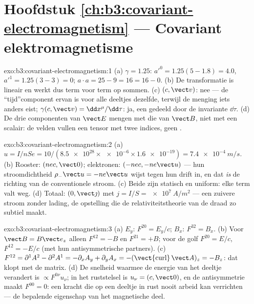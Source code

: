 \section*{Hoofdstuk \ref{ch:b3:covariant-electromagnetism} --- Covariant elektromagnetisme}

\begin{solution}{exo:b3:covariant-electromagnetism:1}
(a) $\gamma = 1.25$: $a'^0 = 1.25(5 - 1.8) = 4.0$, $a'^1 = 1.25(3 -
3) = 0$; $a\cdot a = 25 - 9 = 16 = 16 - 0$. (b) De transformatie is
lineair en werkt dus term voor term op sommen. (c) $(c, \vect v)$: nee
--- de ``tijd''component ervan is voor alle deeltjes dezelfde, terwijl de
menging iets anders eist; $\gamma(c, \vect v) = \dd x^\mu/\dd\tau$: ja,
een  gedeeld door de invariante $\dd\tau$. (d) De drie
componenten van $\vect E$ mengen met die van $\vect B$, niet met een
scalair: de velden vullen een tensor met twee indices, geen .
\end{solution}

\begin{solution}{exo:b3:covariant-electromagnetism:2}
(a) $u = I/nSe = 10/(\num{8.5e28} \times \num{e-6} \times
\num{1.6e-19}) = \qty{7.4e-4}{m/s}$. (b) Rooster: $(nec, \vect 0)$;
elektronen: $(-nec, -ne\vect u)$ --- hun stroomdichtheid $\rho_-\vect u = -ne\vect u$ wijst tegen hun drift in, en dat \emph{is} de richting van de
conventionele stroom. (c) Beide zijn statisch en uniform: elke term valt weg. (d)
Totaal: $(0, \vect\jmath)$ met $j = I/S = \qty{e7}{A/m^2}$ --- een
zuivere stroom zonder lading, de opstelling die de relativiteitstheorie
van de draad zo subtiel maakt.
\end{solution}

\begin{solution}{exo:b3:covariant-electromagnetism:3}
(a) $E_y$: $F^{20} = E_y/c$; $B_x$: $F^{32} = B_x$. (b) Voor $\vect B
= B\vect e_z$ alleen $F^{12} = -B$ en $F^{21} = +B$; voor de golf
$F^{20} = E/c$, $F^{12} = -E/c$ (met hun antisymmetrische partners). (c)
$F^{12} = \partial^1A^2 - \partial^2A^1 = -\partial_xA_y +
\partial_yA_x = -(\operatorname{\vect{curl}}\vect A)_z = -B_z$: dat klopt
met de matrix. (d) De snelheid waarmee de energie van het deeltje
verandert is $\propto F^{0\nu}u_\nu$; in het ruststelsel is $u_\nu = (c, \vect 0)$, en de antisymmetrie maakt $F^{00} = 0$: een kracht die op een
deeltje in rust nooit arbeid kan verrichten --- de bepalende eigenschap
van het magnetische deel.
\end{solution}

